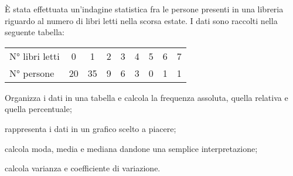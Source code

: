 \begin{esercizio}
\label{ese:A.38}
\`E stata effettuata un'indagine statistica fra le persone presenti in una libreria riguardo al numero di libri letti
nella scorsa estate. I dati sono raccolti nella seguente tabella:
\begin{center}
 \begin{tabular}{l*{8}{c}}
\toprule
N° libri letti & 0 & 1 & 2 & 3 & 4 & 5 & 6 & 7 \\
N° persone & 20 & 35 & 9 & 6 & 3 & 0 & 1 & 1 \\
\bottomrule
\end{tabular}
\end{center}
\begin{enumeratea}
 \item Organizza i dati in una tabella e calcola la frequenza assoluta, quella relativa e quella percentuale;
 \item rappresenta i dati in un grafico scelto a piacere;
 \item calcola moda, media e mediana dandone una semplice interpretazione;
 \item calcola varianza e coefficiente di variazione.
\end{enumeratea}
\end{esercizio}

